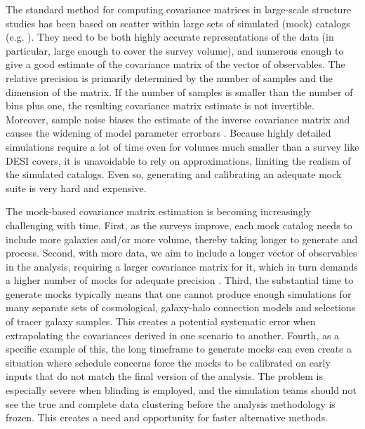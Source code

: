 The standard method for computing covariance matrices in large-scale structure studies has been based on scatter within large sets of simulated (mock) catalogs (e.g. \cite{EZmocks,EZmocks2021,KP3s8-Zhao,Uchuu-GLAM-BOSS,FastPM-DESI}).
They need to be both highly accurate representations of the data (in particular, large enough to cover the survey volume), and numerous enough to give a good estimate of the covariance matrix of the vector of observables.
The relative precision is primarily determined by the number of samples and the dimension of the matrix.
If the number of samples is smaller than the number of bins plus one, the resulting covariance matrix estimate is not invertible.
Moreover, sample noise biases the estimate of the inverse covariance matrix \citep{hartlap-factor} and causes the widening of model parameter errorbars \citep{percival-factor-2021}.
Because highly detailed simulations require a lot of time even for volumes much smaller than a survey like DESI covers, it is unavoidable to rely on approximations, limiting the realism of the simulated catalogs.
Even so, generating and calibrating an adequate mock suite is very hard and expensive.

The mock-based covariance matrix estimation is becoming increasingly challenging with time.
First, as the surveys improve, each mock catalog needs to include more galaxies and/or more volume, thereby taking longer to generate and process.
Second, with more data, we aim to include a longer vector of observables in the analysis, requiring a larger covariance matrix for it, which in turn demands a higher number of mocks for adequate precision \citep{hartlap-factor,cov-matrix-accuracy,percival-factors}.
Third, the substantial time to generate mocks typically means that one cannot produce enough simulations for many separate sets of cosmological, galaxy-halo connection models and selections of tracer galaxy samples.
This creates a potential systematic error when extrapolating the covariances derived in one scenario to another.
Fourth, as a specific example of this, the long timeframe to generate mocks can even create a situation where schedule concerns force the mocks to be calibrated on early inputs that do not match the final version of the analysis.
The problem is especially severe when blinding is employed, and the simulation teams should not see the true and complete data clustering before the analysis methodology is frozen.
This creates a need and opportunity for faster alternative methods.

